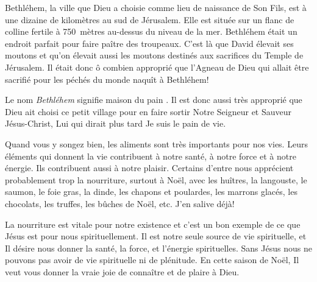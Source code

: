 


Bethléhem, la ville que Dieu a choisie comme lieu de naissance de Son Fils, est à une dizaine de kilomètres au sud de Jérusalem. Elle est située sur un flanc de colline fertile à 750~mètres au-dessus du niveau de la mer. Bethléhem était un endroit parfait pour faire paître des troupeaux. C'est là que David élevait ses moutons et qu'on élevait aussi les moutons destinés aux sacrifices du Temple de Jérusalem. Il était donc ô combien approprié que l'Agneau de Dieu qui allait être sacrifié pour les péchés du monde naquît à Bethléhem!

Le nom \emph{Bethléhem} signifie \Og maison du pain \Fg{}. Il est donc aussi très approprié que Dieu ait choisi ce petit village pour en faire sortir Notre Seigneur et Sauveur Jésus-Christ, Lui qui dirait plus tard\frcolon{} \Og Je suis le pain de vie. \Fg{}

Quand vous y songez bien, les aliments sont très importants pour nos vies. Leurs éléments qui donnent la vie contribuent à notre santé, à notre force et à notre énergie. Ils contribuent aussi à notre plaisir. Certains d'entre nous apprécient probablement trop la nourriture, surtout à Noël, avec les huîtres, la langouste, le saumon, le foie gras, la dinde, les chapons et poulardes, les marrons glacés, les chocolats, les truffes, les bûches de Noël, etc. J'en salive déjà!

La nourriture est vitale pour notre existence et c'est un bon exem\-ple de ce que Jésus est pour nous spirituellement. Il est notre seule source de vie spirituelle, et Il désire nous donner la santé, la force, et l'énergie spirituelles. Sans Jésus nous ne pouvons pas avoir de vie spirituelle ni de plénitude. En cette saison de Noël, Il veut vous donner la vraie joie de connaître et de plaire à Dieu.


\ornrule


